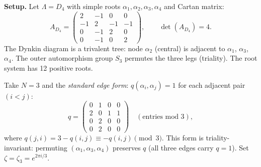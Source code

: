 \begin{computation}[\texorpdfstring{$D_4$}{D_4} at the Coxeter root: \texorpdfstring{$N = 3$}{N = 3}, triality]
\label{comp:lattice:d4-n3}

\noindent\textbf{Setup.}
Let $\Lambda = D_4$ with simple roots $\alpha_1, \alpha_2, \alpha_3,
\alpha_4$ and Cartan matrix:
\[
A_{D_4} =
\begin{pmatrix}
 2 & -1 &  0 &  0 \\
-1 &  2 & -1 & -1 \\
 0 & -1 &  2 &  0 \\
 0 & -1 &  0 &  2
\end{pmatrix},
\qquad
\det(A_{D_4}) = 4.
\]
The Dynkin diagram is a trivalent tree: node $\alpha_2$ (central)
is adjacent to $\alpha_1$, $\alpha_3$, $\alpha_4$.  The outer
automorphism group $S_3$ permutes the three legs (triality).
The root system has 12 positive roots.

Take $N = 3$ and the \emph{standard edge form}:
$q(\alpha_i,\alpha_j) = 1$ for each adjacent pair $(i < j)$:
\[
q = \begin{pmatrix}
0 & 1 & 0 & 0 \\
2 & 0 & 1 & 1 \\
0 & 2 & 0 & 0 \\
0 & 2 & 0 & 0
\end{pmatrix}
\quad (\text{entries mod } 3),
\]
where $q(j,i) = 3 - q(i,j) \equiv -q(i,j) \pmod{3}$.  This form
is triality-invariant: permuting
$(\alpha_1, \alpha_3, \alpha_4)$ preserves $q$
(all three edges carry $q = 1$).
Set $\zeta = \zeta_3 = e^{2\pi i/3}$.
\smallskip


\end{computation}
